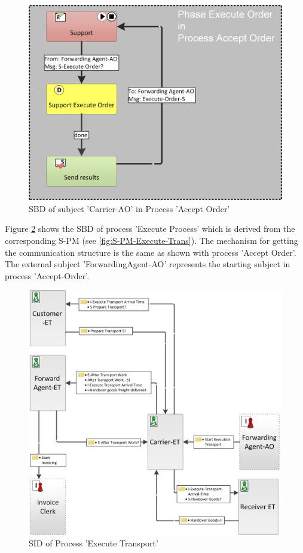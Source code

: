 \begin{figure}[hbtp]
	\includegraphics[scale=0.4]{Figures/Chapter5/Subject-Phase/CarrierAO_NEW.png}
	\caption{SBD of subject 'Carrier-AO' in Process 'Accept Order'}
	\label{fig:CarrierAO}
\end{figure}

Figure \ref{fig:SCD-ExecuteTransport} shows the SBD of process 'Execute Process' which is derived from the corresponding S-PM (see \ref{fig:S-PM-Execute-Trans}). The mechanism for getting the communication structure is the same as shown with process 'Accept Order'. The external subject 'ForwardingAgent-AO' represents the starting subject in process 'Accept-Order'.


\begin{figure}[hbtp]
	\includegraphics[scale=0.4, angle=90]{Figures/Chapter5/Subject-Phase/SCD-ExecuteTransport_NEW.png}
	\caption{SID of Process 'Execute Transport'}
	\label{fig:SCD-ExecuteTransport}
\end{figure}

